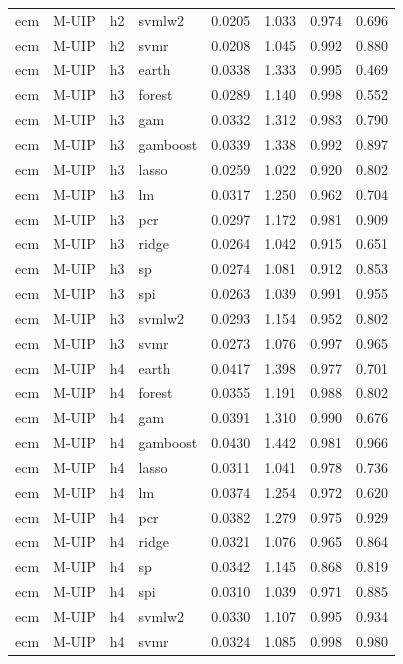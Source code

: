 \begin{ThreePartTable}
\begin{longtable}[t]{llclcccc}
ecm & M-UIP & h2 & svmlw2 & 0.0205 & 1.033 & 0.974 & 0.696\\
ecm & M-UIP & h2 & svmr & 0.0208 & 1.045 & 0.992 & 0.880\\
\addlinespace
ecm & M-UIP & h3 & earth & 0.0338 & 1.333 & 0.995 & 0.469\\
ecm & M-UIP & h3 & forest & 0.0289 & 1.140 & 0.998 & 0.552\\
ecm & M-UIP & h3 & gam & 0.0332 & 1.312 & 0.983 & 0.790\\
ecm & M-UIP & h3 & gamboost & 0.0339 & 1.338 & 0.992 & 0.897\\
ecm & M-UIP & h3 & lasso & 0.0259 & 1.022 & 0.920 & 0.802\\
ecm & M-UIP & h3 & lm & 0.0317 & 1.250 & 0.962 & 0.704\\
ecm & M-UIP & h3 & pcr & 0.0297 & 1.172 & 0.981 & 0.909\\
ecm & M-UIP & h3 & ridge & 0.0264 & 1.042 & 0.915 & 0.651\\
ecm & M-UIP & h3 & sp & 0.0274 & 1.081 & 0.912 & 0.853\\
ecm & M-UIP & h3 & spi & 0.0263 & 1.039 & 0.991 & 0.955\\
ecm & M-UIP & h3 & svmlw2 & 0.0293 & 1.154 & 0.952 & 0.802\\
ecm & M-UIP & h3 & svmr & 0.0273 & 1.076 & 0.997 & 0.965\\
\addlinespace
ecm & M-UIP & h4 & earth & 0.0417 & 1.398 & 0.977 & 0.701\\
ecm & M-UIP & h4 & forest & 0.0355 & 1.191 & 0.988 & 0.802\\
ecm & M-UIP & h4 & gam & 0.0391 & 1.310 & 0.990 & 0.676\\
ecm & M-UIP & h4 & gamboost & 0.0430 & 1.442 & 0.981 & 0.966\\
ecm & M-UIP & h4 & lasso & 0.0311 & 1.041 & 0.978 & 0.736\\
ecm & M-UIP & h4 & lm & 0.0374 & 1.254 & 0.972 & 0.620\\
ecm & M-UIP & h4 & pcr & 0.0382 & 1.279 & 0.975 & 0.929\\
ecm & M-UIP & h4 & ridge & 0.0321 & 1.076 & 0.965 & 0.864\\
ecm & M-UIP & h4 & sp & 0.0342 & 1.145 & 0.868 & 0.819\\
ecm & M-UIP & h4 & spi & 0.0310 & 1.039 & 0.971 & 0.885\\
ecm & M-UIP & h4 & svmlw2 & 0.0330 & 1.107 & 0.995 & 0.934\\
ecm & M-UIP & h4 & svmr & 0.0324 & 1.085 & 0.998 & 0.980\\

\end{longtable}
\end{ThreePartTable}
